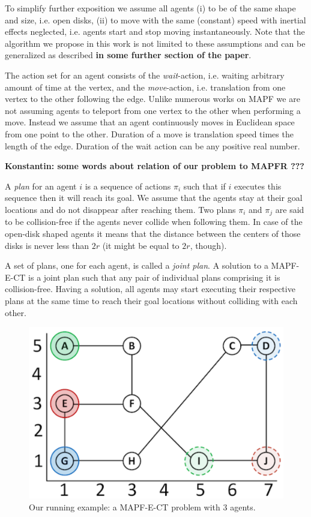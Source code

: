 To simplify further exposition we assume all agents (i) to be of the same shape and size, i.e. open disks, (ii) to move with the same (constant) speed with inertial effects neglected, i.e. agents start and stop moving instantaneously. Note that the \ccbs algorithm we propose in this work is not limited to these assumptions and can be generalized as described \textbf{in some further section of the paper}.

The action set for an agent consists of the \textit{wait}-action, i.e. waiting arbitrary amount of time at the vertex, and the \textit{move}-action, i.e. translation from one vertex to the other following the edge. Unlike numerous works on MAPF we are not assuming agents to teleport from one vertex to the other when performing a move. Instead we assume that an agent continuously moves in Euclidean space from one point to the other. Duration of a move is translation speed times the length of the edge. Duration of the wait action can be any positive real number. 

\textbf{Konstantin: some words about relation of our problem to MAPFR ???}

A \emph{plan} for an agent $i$ is a sequence of actions $\pi_i$ such that if $i$ executes this sequence then it will reach its goal. We assume that the agents stay at their goal locations and do not disappear after reaching them. Two plans $\pi_i$ and $\pi_j$ are said to be collision-free if the agents never collide when following them. In case of the open-disk shaped agents it means that the distance between the centers of those disks is never less than $2r$ (it might be equal to $2r$, though).

A set of plans, one for each agent, is called a \emph{joint plan}. 
A solution to a MAPF-E-CT is a joint plan such that any pair of individual plans comprising it is collision-free. Having a solution, all agents may start executing their respective plans at the same time to reach their goal locations without colliding with each other. 

\begin{figure}
    \centering
    \includegraphics[width=0.6\columnwidth]{example_cropped.pdf}
    \caption{Our running example: a MAPF-E-CT problem with 3 agents.}
    \label{fig:example}
\end{figure}

